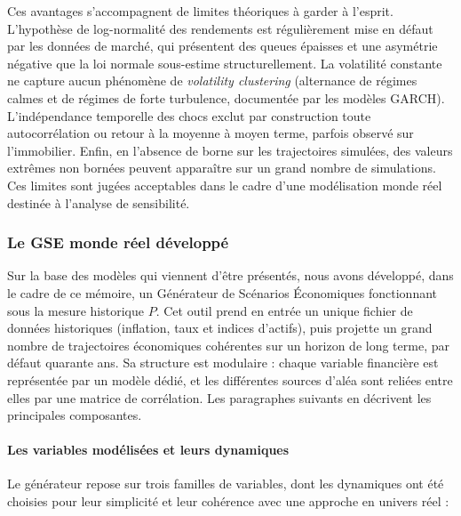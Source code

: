 Ces avantages s'accompagnent de limites théoriques à garder à l'esprit. L'hypothèse de log-normalité des rendements est régulièrement mise en défaut par les données de marché, qui présentent des queues épaisses et une asymétrie négative que la loi normale sous-estime structurellement. La volatilité constante ne capture aucun phénomène de \textit{volatility clustering} (alternance de régimes calmes et de régimes de forte turbulence, documentée par les modèles GARCH). L'indépendance temporelle des chocs exclut par construction toute autocorrélation ou retour à la moyenne à moyen terme, parfois observé sur l'immobilier. Enfin, en l'absence de borne sur les trajectoires simulées, des valeurs extrêmes non bornées peuvent apparaître sur un grand nombre de simulations. Ces limites sont jugées acceptables dans le cadre d'une modélisation monde réel destinée à l'analyse de sensibilité.

\subsubsection{Le GSE monde réel développé}

Sur la base des modèles qui viennent d'être présentés, nous avons développé, dans le cadre de ce mémoire, un Générateur de Scénarios Économiques fonctionnant sous la mesure historique $P$. Cet outil prend en entrée un unique fichier de données historiques (inflation, taux et indices d'actifs), puis projette un grand nombre de trajectoires économiques cohérentes sur un horizon de long terme, par défaut quarante ans. Sa structure est modulaire : chaque variable financière est représentée par un modèle dédié, et les différentes sources d'aléa sont reliées entre elles par une matrice de corrélation. Les paragraphes suivants en décrivent les principales composantes.

\paragraph{Les variables modélisées et leurs dynamiques}

Le générateur repose sur trois familles de variables, dont les dynamiques ont été choisies pour leur simplicité et leur cohérence avec une approche en univers réel :

